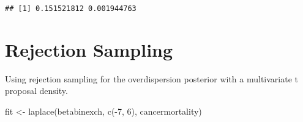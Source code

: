 \documentclass[
]{book}
\newenvironment{Shaded}{\begin{snugshade}}{\end{snugshade}}
\newcommand{\AttributeTok}[1]{\textcolor[rgb]{0.77,0.63,0.00}{#1}}
\newcommand{\ConstantTok}[1]{\textcolor[rgb]{0.00,0.00,0.00}{#1}}
\newcommand{\ControlFlowTok}[1]{\textcolor[rgb]{0.13,0.29,0.53}{\textbf{#1}}}
\newcommand{\DecValTok}[1]{\textcolor[rgb]{0.00,0.00,0.81}{#1}}
\newcommand{\FunctionTok}[1]{\textcolor[rgb]{0.00,0.00,0.00}{#1}}
\newcommand{\NormalTok}[1]{#1}
\newcommand{\OtherTok}[1]{\textcolor[rgb]{0.56,0.35,0.01}{#1}}
\newcommand{\SpecialCharTok}[1]{\textcolor[rgb]{0.00,0.00,0.00}{#1}}
\begin{document}
\begin{verbatim}
## [1] 0.151521812 0.001944763
\end{verbatim}

\hypertarget{rejection-sampling}{%
\section{Rejection Sampling}\label{rejection-sampling}}

Using rejection sampling for the overdispersion posterior with a multivariate t proposal density.

\begin{Shaded}
\begin{Highlighting}[]
\NormalTok{fit }\OtherTok{\textless{}{-}} \FunctionTok{laplace}\NormalTok{(betabinexch,}
               \FunctionTok{c}\NormalTok{(}\SpecialCharTok{{-}}\DecValTok{7}\NormalTok{, }\DecValTok{6}\NormalTok{),}
\NormalTok{               cancermortality)}
\end{Highlighting}
\end{Shaded}

\begin{Shaded}
\end{Shaded}

\begin{Shaded}
\end{Shaded}
\end{document}
